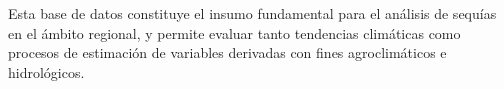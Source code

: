 Esta base de datos constituye el insumo fundamental para el análisis de sequías en el ámbito regional, y permite evaluar tanto tendencias climáticas como procesos de estimación de variables derivadas con fines agroclimáticos e hidrológicos.

    
\begin{comment}
\section{Bases Teóricas y conceptuales}

\section{Conceptualización y definición de la sequía}

El concepto de sequía ha evolucionado a lo largo de la historia. En sus primeras definiciones, como se refleja en los estudios de Grigg (1969), la sequía fue interpretada principalmente como la ausencia de precipitaciones durante períodos prolongados. En Gran Bretaña, el término "sequía" comenzó a utilizarse desde el siglo XVII, principalmente para describir los impactos negativos de la escasez de lluvias en la agricultura. Sin embargo, en esa época, la concepción de la sequía era limitada, pues no se reconocían sus efectos más amplios sobre la economía o la sociedad en general \parencite{eslamian, grigg1969}.

A medida que avanzaron los estudios, investigadores como Lamb (1972) ampliaron la definición de sequía, no solo como la falta de lluvia, sino también incorporando otros factores relevantes como la evaporación y las altas temperaturas, que afectan el balance hídrico en las cuencas hidrográficas. De esta forma, las sequías empezaron a ser vistas como fenómenos climáticos complejos que incluyen tanto la escasez de precipitaciones como la alteración del ciclo natural del agua \parencite{lamb1972}.

Durante la década de 1980, Palmer (1965) presentó una definición más detallada de la sequía, donde no solo se tenía en cuenta la falta de precipitaciones, sino también los efectos que esto tenía sobre los recursos hídricos y la producción agrícola. Palmer definió la sequía como "un periodo prolongado en el cual las precipitaciones son significativamente menores que el promedio histórico", enfatizando que esta definición debe ajustarse según el contexto en el que ocurra, como en la agricultura o el abastecimiento de agua \parencite{palmer1965}.


\end{comment}
